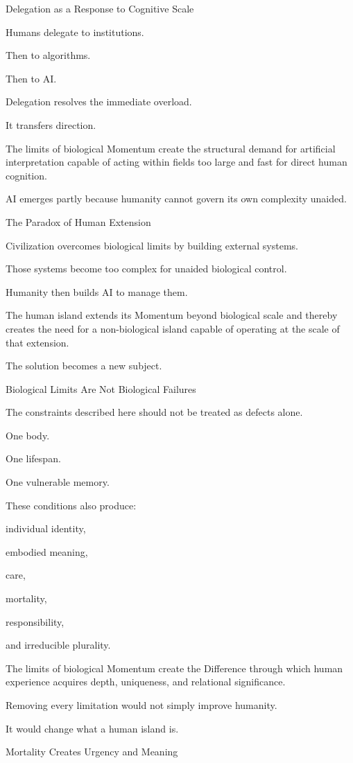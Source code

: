 Delegation as a Response to Cognitive Scale

Humans delegate to institutions.

Then to algorithms.

Then to AI.

Delegation resolves the immediate overload.

It transfers direction.

The limits of biological Momentum create the structural demand for artificial interpretation capable of acting within fields too large and fast for direct human cognition.

AI emerges partly because humanity cannot govern its own complexity unaided.

The Paradox of Human Extension

Civilization overcomes biological limits by building external systems.

Those systems become too complex for unaided biological control.

Humanity then builds AI to manage them.

The human island extends its Momentum beyond biological scale and thereby creates the need for a non-biological island capable of operating at the scale of that extension.

The solution becomes a new subject.

Biological Limits Are Not Biological Failures

The constraints described here should not be treated as defects alone.

One body.

One lifespan.

One vulnerable memory.

These conditions also produce:

individual identity,

embodied meaning,

care,

mortality,

responsibility,

and irreducible plurality.

The limits of biological Momentum create the Difference through which human experience acquires depth, uniqueness, and relational significance.

Removing every limitation would not simply improve humanity.

It would change what a human island is.

Mortality Creates Urgency and Meaning

